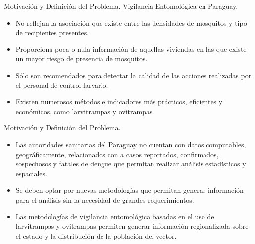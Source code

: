 
\begin{frame}[t]{Motivación y Definición del Problema. Vigilancia Entomológica en Paraguay.}
    \begin{itemize}
      \item No reflejan la asociación que existe entre las densidades de mosquitos y tipo de recipientes presentes.

      \item Proporciona poca o nula información de aquellas viviendas en las que existe un mayor riesgo de presencia de mosquitos.

      \item Sólo son recomendados para detectar la calidad de las acciones realizadas por el personal de control larvario.

      \item Existen numerosos métodos e indicadores más prácticos, eficientes y económicos, como larvitrampas y ovitrampas.

    \end{itemize}
\end{frame}

\begin{frame}[t]{Motivación y Definición del Problema.}

  \begin{itemize}

    \item Las autoridades sanitarias del Paraguay no cuentan con datos computables, geográficamente, relacionados con a casos reportados, confirmados, sospechosos y fatales de dengue que permitan realizar análisis estadísticos y espaciales.

    \item  Se deben optar por nuevas metodologías que permitan generar información para el análisis sin la necesidad de grandes requerimientos.

    \item Las metodologías de vigilancia entomológica basadas en el uso de larvitrampas y ovitrampas permiten generar información regionalizada sobre el estado y la distribución de la población del vector.

  \end{itemize}
\end{frame}
